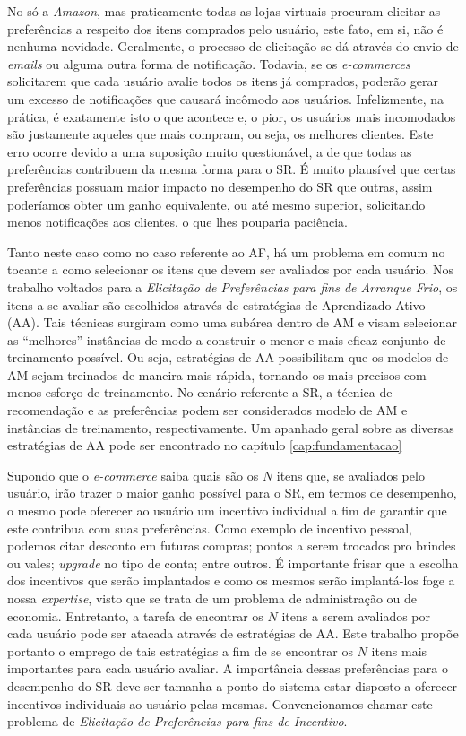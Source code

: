 No só a \textit{Amazon}, mas praticamente todas as lojas virtuais procuram elicitar as preferências a respeito dos itens comprados pelo usuário, este fato, em si, não é nenhuma novidade. Geralmente, o processo de elicitação se dá através do envio de \textit{emails} ou alguma outra forma de notificação. Todavia, se os \textit{e-commerces} solicitarem que cada usuário avalie todos os itens já comprados, poderão gerar um excesso de notificações que causará incômodo aos usuários. Infelizmente, na prática, é exatamente isto o que acontece e, o pior, os usuários mais incomodados são justamente aqueles que mais compram, ou seja, os melhores clientes. Este erro ocorre devido a uma suposição muito questionável, a de que todas as preferências contribuem da mesma forma para o SR. É muito plausível que certas preferências possuam maior impacto no desempenho do SR que outras, assim poderíamos obter um ganho equivalente, ou até mesmo superior, solicitando menos notificações aos clientes, o que lhes pouparia paciência.

Tanto neste caso como no caso referente ao AF, há um problema em comum no tocante a como selecionar os itens que devem ser avaliados por cada usuário. Nos trabalho voltados para a \textit{Elicitação de Preferências para fins de Arranque Frio}, os itens a se avaliar são escolhidos através de estratégias de Aprendizado Ativo (AA). Tais técnicas surgiram como uma subárea dentro de AM e visam selecionar as ``melhores'' instâncias de modo a construir o menor e mais eficaz conjunto de treinamento possível. Ou seja, estratégias de AA possibilitam que os modelos de AM sejam treinados de maneira mais rápida, tornando-os mais precisos com menos esforço de treinamento. No cenário referente a SR, a técnica de recomendação e as preferências podem ser considerados modelo de AM e instâncias de treinamento, respectivamente. Um apanhado geral sobre as diversas estratégias de AA pode ser encontrado no capítulo \ref{cap:fundamentacao}


Supondo que o \textit{e-commerce} saiba quais são os $N$ itens que, se avaliados pelo usuário, irão trazer o maior ganho possível para o SR, em termos de desempenho, o mesmo pode oferecer ao usuário um incentivo individual a fim de garantir que este contribua com suas preferências. Como exemplo de incentivo pessoal, podemos citar desconto em futuras compras; pontos a serem trocados pro brindes ou vales; \textit{upgrade} no tipo de conta; entre outros. É importante frisar que a escolha dos incentivos que serão implantados e como os mesmos serão implantá-los foge a nossa \textit{expertise}, visto que se trata de um problema de administração ou de economia. Entretanto, a tarefa de encontrar os $N$ itens a serem avaliados por cada usuário pode ser atacada através de estratégias de AA. Este trabalho propõe portanto o emprego de tais estratégias a fim de se encontrar os $N$ itens mais importantes para cada usuário avaliar. A importância dessas preferências para o desempenho do SR deve ser tamanha a ponto do sistema estar disposto a oferecer incentivos individuais ao usuário pelas mesmas. Convencionamos chamar este problema de \textit{Elicitação de Preferências para fins de Incentivo}.


